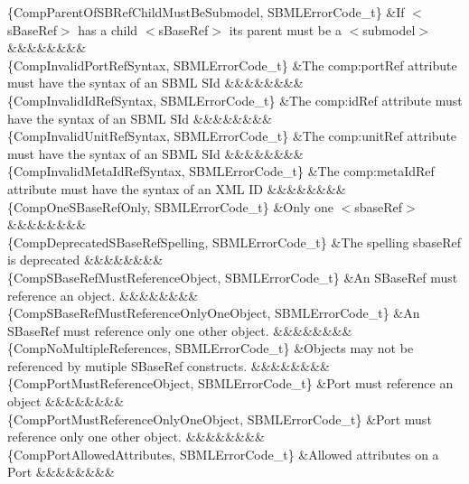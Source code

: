 \begin{DoxyParagraph}{}
\begin{longtabu}
\{Comp\+Parent\+Of\+S\+B\+Ref\+Child\+Must\+Be\+Submodel, S\+B\+M\+L\+Error\+Code\+\_\+t\} &If {\ttfamily $<$s\+Base\+Ref$>$} has a child {\ttfamily $<$s\+Base\+Ref$>$} its parent must be a {\ttfamily $<$submodel$>$} &&&&&&&&\\
\{Comp\+Invalid\+Port\+Ref\+Syntax, S\+B\+M\+L\+Error\+Code\+\_\+t\} &The \textquotesingle{}comp\+:port\+Ref\textquotesingle{} attribute must have the syntax of an S\+B\+ML S\+Id &&&&&&&&\\
\{Comp\+Invalid\+Id\+Ref\+Syntax, S\+B\+M\+L\+Error\+Code\+\_\+t\} &The \textquotesingle{}comp\+:id\+Ref\textquotesingle{} attribute must have the syntax of an S\+B\+ML S\+Id &&&&&&&&\\
\{Comp\+Invalid\+Unit\+Ref\+Syntax, S\+B\+M\+L\+Error\+Code\+\_\+t\} &The \textquotesingle{}comp\+:unit\+Ref\textquotesingle{} attribute must have the syntax of an S\+B\+ML S\+Id &&&&&&&&\\
\{Comp\+Invalid\+Meta\+Id\+Ref\+Syntax, S\+B\+M\+L\+Error\+Code\+\_\+t\} &The \textquotesingle{}comp\+:meta\+Id\+Ref\textquotesingle{} attribute must have the syntax of an X\+ML ID &&&&&&&&\\
\{Comp\+One\+S\+Base\+Ref\+Only, S\+B\+M\+L\+Error\+Code\+\_\+t\} &Only one {\ttfamily $<$sbase\+Ref$>$} &&&&&&&&\\
\{Comp\+Deprecated\+S\+Base\+Ref\+Spelling, S\+B\+M\+L\+Error\+Code\+\_\+t\} &The spelling \textquotesingle{}sbase\+Ref\textquotesingle{} is deprecated &&&&&&&&\\
\{Comp\+S\+Base\+Ref\+Must\+Reference\+Object, S\+B\+M\+L\+Error\+Code\+\_\+t\} &An S\+Base\+Ref must reference an object. &&&&&&&&\\
\{Comp\+S\+Base\+Ref\+Must\+Reference\+Only\+One\+Object, S\+B\+M\+L\+Error\+Code\+\_\+t\} &An S\+Base\+Ref must reference only one other object. &&&&&&&&\\
\{Comp\+No\+Multiple\+References, S\+B\+M\+L\+Error\+Code\+\_\+t\} &Objects may not be referenced by mutiple S\+Base\+Ref constructs. &&&&&&&&\\
\{Comp\+Port\+Must\+Reference\+Object, S\+B\+M\+L\+Error\+Code\+\_\+t\} &Port must reference an object &&&&&&&&\\
\{Comp\+Port\+Must\+Reference\+Only\+One\+Object, S\+B\+M\+L\+Error\+Code\+\_\+t\} &Port must reference only one other object. &&&&&&&&\\
\{Comp\+Port\+Allowed\+Attributes, S\+B\+M\+L\+Error\+Code\+\_\+t\} &Allowed attributes on a Port &&&&&&&&\\

\end{longtabu}
\end{DoxyParagraph}
